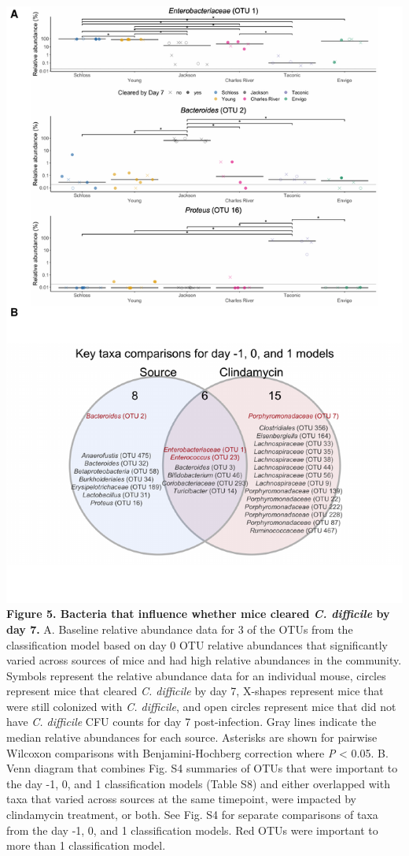 \documentclass[11pt,]{article}
\begin{document}
\includegraphics{figure_5.pdf} \textbf{Figure 5. Bacteria that influence
whether mice cleared \emph{C. difficile} by day 7.} A. Baseline relative
abundance data for 3 of the OTUs from the classification model based on
day 0 OTU relative abundances that significantly varied across sources
of mice and had high relative abundances in the community. Symbols
represent the relative abundance data for an individual mouse, circles
represent mice that cleared \emph{C. difficile} by day 7, X-shapes
represent mice that were still colonized with \emph{C. difficile}, and
open circles represent mice that did not have \emph{C. difficile} CFU
counts for day 7 post-infection. Gray lines indicate the median relative
abundances for each source. Asterisks are shown for pairwise Wilcoxon
comparisons with Benjamini-Hochberg correction where \emph{P}
\textless{} 0.05. B. Venn diagram that combines Fig. S4 summaries of
OTUs that were important to the day -1, 0, and 1 classification models
(Table S8) and either overlapped with taxa that varied across sources at
the same timepoint, were impacted by clindamycin treatment, or both. See
Fig. S4 for separate comparisons of taxa from the day -1, 0, and 1
classification models. Red OTUs were important to more than 1
classification model.
\end{document}
